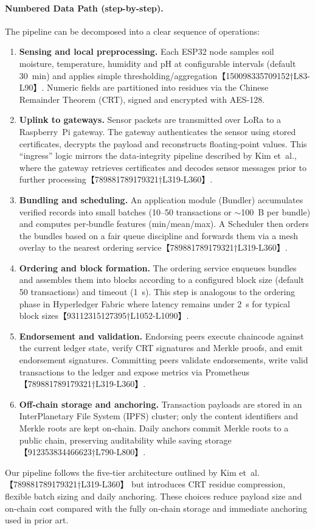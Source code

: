\documentclass[12pt,onecolumn]{IEEEtran} %
\begin{document}
\paragraph{Numbered Data Path (step-by-step).}
The pipeline can be decomposed into a clear sequence of operations:
\begin{enumerate}
  \item \textbf{Sensing and local preprocessing.}  Each ESP32 node samples soil moisture, temperature, humidity and pH at configurable intervals (default 30~min) and applies simple thresholding/aggregation【150098335709152†L83-L90】.  Numeric fields are partitioned into residues via the Chinese Remainder Theorem (CRT), signed and encrypted with AES-128.
  \item \textbf{Uplink to gateways.}  Sensor packets are transmitted over LoRa to a Raspberry~Pi gateway.  The gateway authenticates the sensor using stored certificates, decrypts the payload and reconstructs floating‑point values.  This ``ingress'' logic mirrors the data‑integrity pipeline described by Kim et~al., where the gateway retrieves certificates and decodes sensor messages prior to further processing【789881789179321†L319-L360】.
  \item \textbf{Bundling and scheduling.}  An application module (Bundler) accumulates verified records into small batches (10--50 transactions or $\sim$100~B per bundle) and computes per‑bundle features (min/mean/max).  A Scheduler then orders the bundles based on a fair queue discipline and forwards them via a mesh overlay to the nearest ordering service【789881789179321†L319-L360】.
  \item \textbf{Ordering and block formation.}  The ordering service enqueues bundles and assembles them into blocks according to a configured block size (default 50 transactions) and timeout (1~s).  This step is analogous to the ordering phase in Hyperledger Fabric where latency remains under 2~s for typical block sizes【93112315127395†L1052-L1090】.
  \item \textbf{Endorsement and validation.}  Endorsing peers execute chaincode against the current ledger state, verify CRT signatures and Merkle proofs, and emit endorsement signatures.  Committing peers validate endorsements, write valid transactions to the ledger and expose metrics via Prometheus【789881789179321†L319-L360】.
  \item \textbf{Off‑chain storage and anchoring.}  Transaction payloads are stored in an InterPlanetary File System (IPFS) cluster; only the content identifiers and Merkle roots are kept on‑chain.  Daily anchors commit Merkle roots to a public chain, preserving auditability while saving storage【912353834466623†L790-L800】.
\end{enumerate}
Our pipeline follows the five‑tier architecture outlined by Kim et~al.【789881789179321†L319-L360】 but introduces CRT residue compression, flexible batch sizing and daily anchoring.  These choices reduce payload size and on‑chain cost compared with the fully on‑chain storage and immediate anchoring used in prior art.
\end{document}
